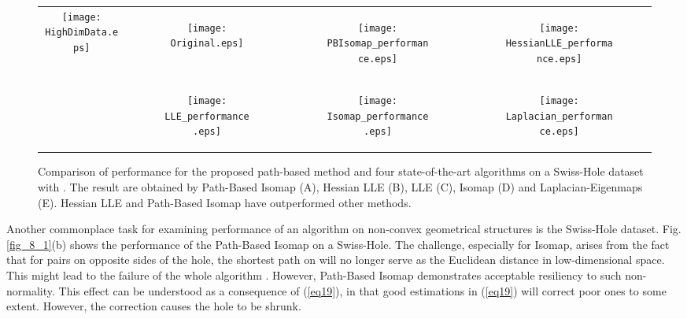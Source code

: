 \documentclass[10pt,journal,cspaper,compsoc]{IEEEtran}
\let\MYoriglatexcaption\caption
\renewcommand{\caption}[2][\relax]{\MYoriglatexcaption[#2]{#2}}
\begin{document}
\begin{figure*}[t]    
\centering
\begin{tabular}{cc|ccc}
	\multicolumn{2}{c|}{\multirow{2}{*}{	
\begin{minipage}[r]{0.3\textwidth}
			\vspace{-4mm}
			\texttt{[image: HighDimData.eps]}
		\end{minipage}    	    	    	
}} & 
	\begin{subfigure}[c]{0.2\textwidth}
        \texttt{[image: Original.eps]}
    \end{subfigure} & 
	\begin{subfigure}[c]{0.2\textwidth}
    	\texttt{[image: PBIsomap\_performance.eps]}                
    \end{subfigure} &
	\begin{subfigure}[c]{0.2\textwidth}
        \texttt{[image: HessianLLE\_performance.eps]}
    \end{subfigure}    
    \\ \multicolumn{2}{c|}{} & 
	\begin{subfigure}[c]{0.2\textwidth}
        \texttt{[image: LLE\_performance.eps]}
    \end{subfigure} &
    \begin{subfigure}[c]{0.2\textwidth}
    	\texttt{[image: Isomap\_performance.eps]}
    \end{subfigure} &
    \begin{subfigure}[c]{0.2\textwidth}
    	\texttt{[image: Laplacian\_performance.eps]}
    \end{subfigure}
\end{tabular}
	\vspace{3mm}
    \caption{{\small Comparison of performance for the proposed path-based method and four state-of-the-art algorithms on a Swiss-Hole dataset with . The result are obtained by Path-Based Isomap (A), Hessian LLE (B), LLE (C), Isomap (D) and Laplacian-Eigenmaps (E). Hessian LLE and Path-Based Isomap have outperformed other methods.}}
    \label{fig_perf_comp}
\end{figure*}

Another commonplace task for examining performance of an algorithm on non-convex geometrical structures is the Swiss-Hole dataset.
Fig.\ref{fig_8_1}(b) shows the performance of the Path-Based Isomap on a Swiss-Hole. The challenge, especially for Isomap, arises from the fact that for pairs on opposite sides of the hole, the shortest path on  will no longer serve as the Euclidean distance in low-dimensional space. This might lead to the failure of the whole algorithm \cite{wang2008manifold}. However, Path-Based Isomap demonstrates acceptable resiliency to such non-normality. This effect can be understood as a consequence of (\ref{eq19}), in that good estimations in (\ref{eq19}) will correct poor ones to some extent. However, the correction causes the hole to be shrunk.
\end{document}
